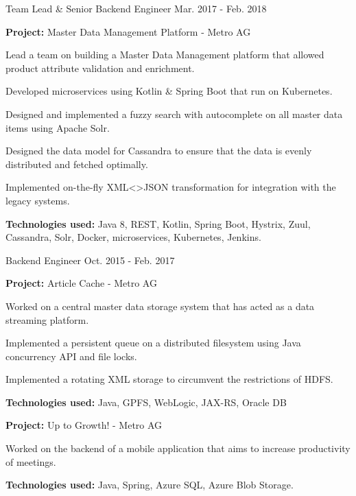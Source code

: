 \begin{cventries}
    \cventry
    {Team Lead \& Senior Backend Engineer}
    {}
    {}
    {Mar. 2017 - Feb. 2018}
    {
        \begin{cvitems}
            \item {
                \textbf{Project:} Master Data Management Platform - Metro AG
            }
            \newline
            \item {
                Lead a team on building a Master Data Management platform that allowed product attribute validation and enrichment.
            }
            \item {
                Developed microservices using Kotlin \& Spring Boot that run on Kubernetes.
            }
            \item {
                Designed and implemented a fuzzy search with autocomplete on all master data items using Apache Solr.
            }
            \item {
                Designed the data model for Cassandra to ensure that the data is evenly distributed and fetched optimally.
            }
            \item {
                Implemented on-the-fly XML<>JSON transformation for integration with the legacy systems.
            }
            \smallskip
            \item {
                \textbf{Technologies used:} Java 8, REST, Kotlin, Spring Boot, Hystrix, Zuul, Cassandra,
                Solr, Docker, microservices, Kubernetes, Jenkins.
            }
        \end{cvitems}
    }

    \cventry
    {Backend Engineer}
    {}
    {}
    {Oct. 2015 - Feb. 2017}
    {
        \begin{cvitems}
            \item {\textbf{Project:} Article Cache - Metro AG}
            \item {
                Worked on a central master data storage system that has acted as a data streaming platform.
            }
            \item {
                Implemented a persistent queue on a distributed filesystem using Java concurrency API and file locks.
            }
            \item {
                Implemented a rotating XML storage to circumvent the restrictions of HDFS.
            }
            \smallskip
            \item {\textbf{Technologies used:} Java, GPFS, WebLogic, JAX-RS, Oracle DB}
            \medskip
            \item {\textbf{Project:} Up to Growth! - Metro AG}
            \item {
                Worked on the backend of a mobile application that aims to increase productivity of meetings.
            }
            \smallskip
            \item {\textbf{Technologies used:} Java, Spring, Azure SQL, Azure Blob Storage.}
        \end{cvitems}
    }


\end{cventries}
